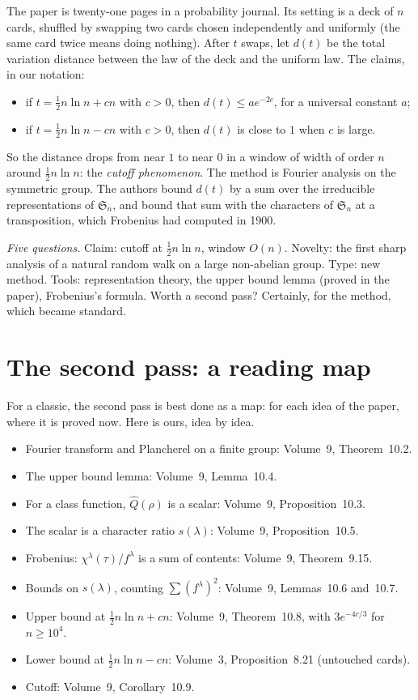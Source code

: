 The paper is twenty-one pages in a probability journal. Its setting is a deck of $n$ cards, shuffled by swapping two cards chosen independently and
uniformly (the same card twice means doing nothing). After $t$ swaps, let $d(t)$ be the total variation distance between the law of the deck and
the uniform law. The claims, in our notation:
\begin{itemize}
\item if $t=\frac12n\ln n+cn$ with $c>0$, then $d(t)\le ae^{-2c}$, for a universal constant $a$;
\item if $t=\frac12n\ln n-cn$ with $c>0$, then $d(t)$ is close to $1$ when $c$ is large.
\end{itemize}
So the distance drops from near $1$ to near $0$ in a window of width of order $n$ around $\frac12n\ln n$: the \emph{cutoff phenomenon}. The method is
Fourier analysis on the symmetric group. The authors bound $d(t)$ by a sum over the irreducible
representations of $\mathfrak S_n$, and bound that sum with the characters of $\mathfrak S_n$ at a transposition, which Frobenius had computed in 1900.

\emph{Five questions.} Claim: cutoff at $\frac12n\ln n$, window $O(n)$. Novelty: the first sharp analysis of a natural random walk on a large
non-abelian group. Type: new method. Tools: representation theory, the upper bound lemma (proved in the paper), Frobenius's formula. Worth a second
pass? Certainly, for the method, which became standard.

\section{The second pass: a reading map}

For a classic, the second pass is best done as a map: for each idea of the paper, where it is proved now. Here is ours, idea by idea.

\begin{itemize}
\item Fourier transform and Plancherel on a finite group: Volume~9, Theorem~10.2.
\item The upper bound lemma: Volume~9, Lemma~10.4.
\item For a class function, $\hat Q(\rho)$ is a scalar: Volume~9, Proposition~10.3.
\item The scalar is a character ratio $s(\lambda)$: Volume~9, Proposition~10.5.
\item Frobenius: $\chi^\lambda(\tau)/f^\lambda$ is a sum of contents: Volume~9, Theorem~9.15.
\item Bounds on $s(\lambda)$, counting $\sum(f^\lambda)^2$: Volume~9, Lemmas~10.6 and~10.7.
\item Upper bound at $\frac12n\ln n+cn$: Volume~9, Theorem~10.8, with $3e^{-4c/3}$ for $n\ge10^4$.
\item Lower bound at $\frac12n\ln n-cn$: Volume~3, Proposition~8.21 (untouched cards).
\item Cutoff: Volume~9, Corollary~10.9.
\end{itemize}

